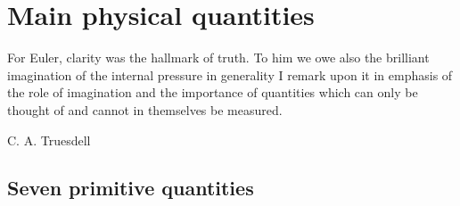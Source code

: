 \documentclass[a4paper,12pt,%
onecolumn,oneside,%
british%
]{memoir}
\renewcommand*{\|}[1][]{\nonscript\:#1\vert\nonscript\:\mathopen{}}
\begin{document}
%
%
%
%





\printpagenotes*
\clearpage
\chapter{Main physical quantities}
\label{cha:stuff}

\epigraph{For Euler, clarity was the hallmark of truth. \textelp{} To him we owe also the brilliant imagination of the internal pressure in generality
  \textelp{} I remark upon it in emphasis of the role of imagination and the importance of quantities which can only be thought of and cannot in themselves be measured.}{C. A. Truesdell \cites*{truesdell1956d}}



\section[Seven primitive quantities]{Seven primitive quantities}
\label{sec:stuff}
\end{document}
